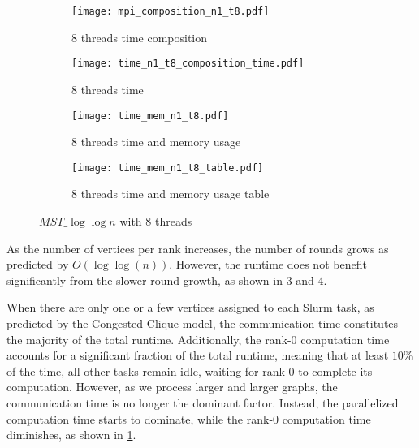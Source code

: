 \documentclass[english, 12pt, a4paper, elec, utf8, a-2b, online]{aaltothesis}
\newcommand{\mstalgo}{$MST\_\log\log{n}$}
\begin{document}
\begin{figure}[h]
	\centering

	\begin{subfigure}[b]{0.45\textwidth}
			\centering
			\texttt{[image: mpi\_composition\_n1\_t8.pdf]}
			\caption{8 threads time composition}
			\label{fig:mpi_composition_n1_t8}
	\end{subfigure}
	\begin{subfigure}[b]{0.45\textwidth}
		\centering
		\texttt{[image: time\_n1\_t8\_composition\_time.pdf]}
		\caption{8 threads time}
		\label{fig:mpi_n1_t8_time}
	\end{subfigure}
	\vspace{0mm} %
	\begin{subfigure}[b]{0.45\textwidth}
			\centering
			\texttt{[image: time\_mem\_n1\_t8.pdf]}
			\caption{8 threads time and memory usage}
			\label{fig:mpi_composition_n1_t8_time_mem}
	\end{subfigure}
	\hfill
	\begin{subfigure}[b]{0.45\textwidth}
		\centering
		\texttt{[image: time\_mem\_n1\_t8\_table.pdf]}
		\caption{8 threads time and memory usage table}
		\label{fig:mpi_composition_n1_t8_time_mem_table}
	\end{subfigure}

	\caption{\mstalgo{} with 8 threads}
	\label{fig:mpi_composition_n1_t8_}
\end{figure}

As the number of vertices per rank increases, the number of rounds grows as predicted by $O(\log{\log(n)})$. However, the runtime does not benefit significantly from the slower round growth, as shown in \cref{fig:mpi_composition_n1_t8_time_mem} and \cref{fig:mpi_composition_n1_t8_time_mem_table}.

When there are only one or a few vertices assigned to each Slurm task, as predicted by the Congested Clique model, the communication time constitutes the majority of the total runtime. Additionally, the rank-0 computation time accounts for a significant fraction of the total runtime, meaning that at least $10\%$ of the time, all other tasks remain idle, waiting for rank-0 to complete its computation. However, as we process larger and larger graphs, the communication time is no longer the dominant factor. Instead, the parallelized computation time starts to dominate, while the rank-0 computation time diminishes, as shown in \cref{fig:mpi_composition_n1_t8}.
\end{document}
